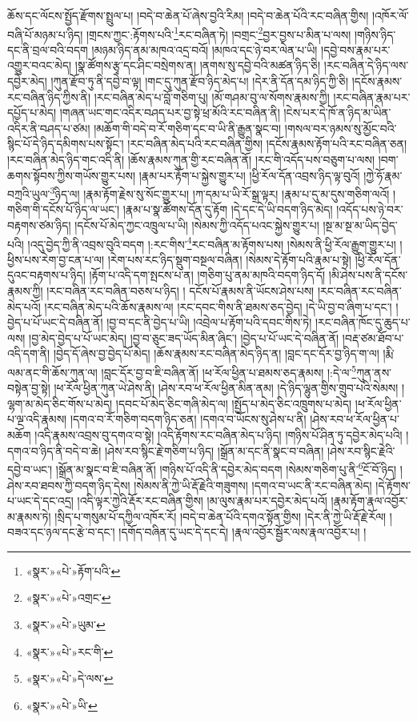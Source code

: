 ཆོས་དང་ལོངས་སྤྱོད་རྫོགས་སྤྲུལ་པ། །བདེ་བ་ཆེན་པོ་ཞེས་བྱའི་རིམ། །བདེ་བ་ཆེན་པོའི་རང་བཞིན་གྱིས། །འཁོར་ལོ་བཞི་པོ་མཉམ་པ་ཉིད། །གྲངས་ཀྱང་:རྟོགས་པའི་\footnote{«སྣར་»«པེ་»རྟོག་པའི་}རང་བཞིན་ཏེ། །བགྲང་\footnote{«སྣར་»«པེ་»འགྲང་}བྱར་བྱས་པ་མིན་པ་ལས། །གཉིས་ཉིད་དང་ནི་བྲལ་བའི་བདག །མཉམ་ཉིད་ནམ་མཁའ་འདྲ་བའོ། །མཁའ་དང་ཉེ་བར་ལེན་པ་ཡི། །དབྱེ་བས་རྣམ་པར་འགྱུར་བའང་མེད། །སྣ་ཚོགས་རྩྭ་དང་ཤིང་བསྲེགས་ན། །ནགས་སུ་དབྱེ་བའི་མཚན་ཉིད་ཅི། །རང་བཞིན་དེ་ཉིད་ལས་དབྱེར་མེད། །ཀུན་རྫོབ་ཏུ་ནི་དབྱེ་བ་ལྟ། །གང་དུ་ཀུན་རྫོབ་ཉིད་མེད་པ། །དེར་ནི་དོན་དམ་ཉིད་ཀྱི་ཅི། །དངོས་རྣམས་རང་བཞིན་ཉིད་ཀྱིས་ནི། །རང་བཞིན་མེད་པ་བློ་གཅིག་པུ། །མོ་གཤམ་བུ་ལ་སོགས་རྣམས་ཀྱི། །རང་བཞིན་རྣམ་པར་དཔྱོད་པ་མེད། །གཞན་ཡང་གང་འདིར་བཤད་པར་བྱ་སྟེ་ཕྲ་མོའི་རང་བཞིན་ནི། །ངེས་པར་དེ་ཁོ་ན་ཉིད་མ་ཡིན་འདིར་ནི་བཤད་པ་ཙམ། །མཆོག་གི་བདེ་བ་རོ་གཅིག་དང་བ་ཡི་ནི་རྒྱུན་སྣང་བ། །གསལ་བར་ཉམས་སུ་མྱོང་བའི་སྙིང་པོ་དེ་ཉིད་དམིགས་པས་སྟོང་། །རང་བཞིན་མེད་པའི་རང་བཞིན་གྱིས། །དངོས་རྣམས་རྟོག་པའི་རང་བཞིན་ཅན། །རང་བཞིན་མེད་ཉིད་གང་འདི་ནི། །ཆོས་རྣམས་ཀུན་གྱི་རང་བཞིན་ནོ། །རང་གི་འདོད་པས་བཅུག་པ་ལས། །བག་ཆགས་སྟོབས་ཀྱིས་གཡོས་གྱུར་པས། །རྣམ་པར་རྟོག་པ་སྐྱེས་གྱུར་པ། །ཕྱི་རོལ་དོན་འབྲས་ཉིད་ལྟ་བུའོ། །ཀྱེ་ཧོ་རྣམ་བཀྲའི་ཡུལ་\footnote{«སྣར་»«པེ་»ཡུམ་}ཉིད་ལ། །རྣམ་རྟོག་རྗེས་སུ་སོང་གྱུར་པ། །ཀ་དམ་པ་ཡི་རོ་སྒྲ་ལྟར། །རྣམ་པ་དུ་མ་དུས་གཅིག་ལའོ། །གཅིག་གི་དངོས་པོ་ཉིད་ལ་ཡང་། །རྣམ་པ་སྣ་ཚོགས་དོན་དུ་རྟོག །དེ་དང་དེ་ཡི་བདག་ཉིད་མེད། །འདོད་པས་ཉེ་བར་བརྟགས་ཙམ་ཉིད། །དངོས་པོ་མེད་ཀྱང་འཁྲུལ་པ་ཡི། །སེམས་ཀྱི་འདོད་པའང་སྐྱེས་གྱུར་པ། །སྔ་མ་སྔ་མ་ཡིད་བྱེད་པའི། །འདུ་བྱེད་ཀྱི་ནི་འབྲས་བུའི་བདག །:རང་གིས་\footnote{«སྣར་»«པེ་»རང་གི་}རང་བཞིན་མ་རྟོགས་པས། །སེམས་ནི་ཕྱི་རོལ་རྒྱུག་གྱུར་པ། །ཕྱིས་པས་རེག་བྱ་ངན་པ་ལ། །རེག་པས་རང་ཉིད་སྡུག་བསྔལ་བཞིན། །སེམས་དེ་རྟོག་པའི་རྣམ་པ་སྟེ། །ཕྱི་རོལ་དོན་དུའང་བརྟགས་པ་ཉིད། །རྟོག་པ་འདི་དག་སྤངས་པ་ན། །གཅིག་པུ་ནམ་མཁའི་བདག་ཉིད་དོ། །མི་ཤེས་པས་ནི་དངོས་རྣམས་ཀྱི། །རང་བཞིན་རང་བཞིན་བཅས་པ་ཉིད། །
དངོས་པོ་རྣམས་ནི་ཡོངས་ཤེས་པས། །རང་བཞིན་རང་བཞིན་མེད་པའོ། །རང་བཞིན་མེད་པའི་ཆོས་རྣམས་ལ། །རང་དབང་གིས་ནི་ཐམས་ཅད་བྱེད། །དེ་ཡི་བྱ་བ་ཞིག་པ་དང་། །བྱེད་པ་པོ་ཡང་དེ་བཞིན་ནོ། །བྱ་བ་དང་ནི་བྱེད་པ་ཡི། །འབྲེལ་པ་རྟོག་པའི་དབང་གིས་ཏེ། །རང་བཞིན་ཁོང་དུ་ཆུད་པ་ལས། །བྱ་མེད་བྱེད་པ་པོ་ཡང་མེད། །བྱ་བ་ཅུང་ཟད་ཡོད་མིན་ཞིང་། །བྱེད་པ་པོ་ཡང་དེ་བཞིན་ནོ། །བརྡ་ཙམ་ཐོབ་པ་འདི་དག་ནི། །བྱེད་དོ་ཞེས་བྱ་བྱེད་པོ་མེད། །ཆོས་རྣམས་རང་བཞིན་མེད་ཉིད་ན། །བླང་དང་དོར་བྱ་ཉིད་ག་ལ། །རྨི་ལམ་ནང་གི་ཆོས་ཀུན་ལ། །བླང་དོར་བྱ་བ་ཇི་བཞིན་ནོ། །ཕ་རོལ་ཕྱིན་པ་ཐམས་ཅད་རྣམས། །:དེ་ལ་\footnote{«སྣར་»«པེ་»དེ་ལས་}ཀུན་ནས་བསྟེན་བྱ་སྟེ། །ཕ་རོལ་ཕྱིན་ཀུན་ཡེ་ཤེས་ནི། །ཤེས་རབ་ཕ་རོལ་ཕྱིན་མིན་ནམ། །དེ་ཉིད་ལྷུན་གྱིས་གྲུབ་པའི་སེམས། །ལྷག་མ་མེད་ཅིང་གོས་པ་མེད། །དབང་པོ་མེད་ཅིང་གཞི་མེད་ལ། །སྤྱོད་པ་མེད་ཅིང་འཁྲུགས་པ་མེད། །ཕ་རོལ་ཕྱིན་པ་ལྔ་འདི་རྣམས། །དགའ་བ་རོ་གཅིག་བདག་ཉིད་ཅན། །དགའ་བ་ཡོངས་སུ་ཤེས་པ་ནི། །ཤེས་རབ་ཕ་རོལ་ཕྱིན་པ་མཆོག །འདི་རྣམས་འབྲས་བུ་དགའ་བ་སྟེ། །འདི་རྟོགས་རང་བཞིན་མེད་པ་ཉིད། །གཉིས་པོ་ཤིན་ཏུ་དབྱེར་མེད་པའི། །དགའ་བ་ཉིད་ནི་བདེ་བ་ཆེ། །ཤེས་རབ་སྙིང་རྗེ་གཅིག་པ་ཉིད། །སྒྲོན་མ་དང་ནི་སྣང་བ་བཞིན། །ཤེས་རབ་སྙིང་རྗེའི་དབྱེ་བ་ཡང་། །སྒྲོན་མ་སྣང་བ་ཇི་བཞིན་ནོ། །གཉིས་པོ་འདི་ནི་དབྱེར་མེད་བདག །སེམས་གཅིག་པུ་ནི་\footnote{«སྣར་»«པེ་»ཡི་}ངོ་བོ་ཉིད། །ཤེས་རབ་ཐབས་ཀྱི་བདག་ཉིད་དེས། །སེམས་ནི་ཀྱེ་ཡི་རྡོ་རྗེའི་གཟུགས། །དགའ་བ་ཡང་ནི་རང་བཞིན་མེད། །དེ་རྟོགས་པ་ཡང་དེ་དང་འདྲ། །འདི་ལྟར་ཀྱེའི་རྡོར་རང་བཞིན་གྱིས། །མ་ལུས་རྣམ་པར་དབྱེར་མེད་པའོ། །རྣམ་རྟོག་རྣལ་འབྱོར་མ་རྣམས་ཏེ། །སྲིད་པ་གསུམ་པོ་དཀྱིལ་འཁོར་རོ། །བདེ་བ་ཆེན་པོའི་དགའ་སྟོན་གྱིས། །དེར་ནི་ཀྱེ་ཡི་རྡོ་རྗེ་རོལ། །བཟའ་དང་ཉལ་དང་རྩེ་བ་དང་། །དགོད་བཞིན་དུ་ཡང་དེ་དང་དེ། །རྣལ་འབྱོར་སྦྱོར་ལས་རྣལ་འབྱོར་པ། །
